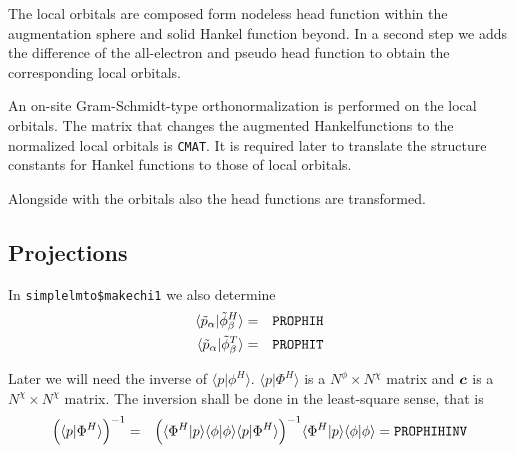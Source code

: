 \documentclass[11pt,a4paper]{report}
\begin{document}
The local orbitals are composed form nodeless head function within the
augmentation sphere and solid Hankel function beyond. In a second step
we adds the difference of the all-electron and pseudo head function to
obtain the corresponding local orbitals.

An on-site Gram-Schmidt-type orthonormalization is performed on the
local orbitals. The matrix that changes the augmented Hankelfunctions
to the normalized local orbitals is \verb|CMAT|. It is required later
to translate the structure constants for Hankel functions to those of
local orbitals.

Alongside with the orbitals also the head functions are transformed.

\subsection{Projections}
In \verb|simplelmto$makechi1| we also determine
\begin{eqnarray}
\langle\tilde{p}_\alpha|\tilde{\phi}^H_\beta\rangle &=& \verb|PROPHIH|
\nonumber\\
\langle\tilde{p}_\alpha|\tilde{\phi}^T_\beta\rangle &=& \verb|PROPHIT|
\end{eqnarray}

Later we will need the inverse of $\langle{p}|\phi^H\rangle$.
$\langle{p}|\Phi^H\rangle$ is a $N^\phi\times N^\chi$ matrix and
$\bm{c}$ is a $N^\chi\times N^\chi$ matrix.  The inversion shall be
done in the least-square sense, that is
\begin{eqnarray}
\Bigl(\langle{p}|\Phi^H\rangle\Bigr)^{-1}
&=&
\Bigl(\langle\Phi^H|p\rangle
\langle\phi|\phi\rangle
\langle{p}|\Phi^H\rangle\Bigr)^{-1}
\langle\Phi^H|p\rangle\langle\phi|\phi\rangle=\verb|PROPHIHINV|
\end{eqnarray}

\end{document}
